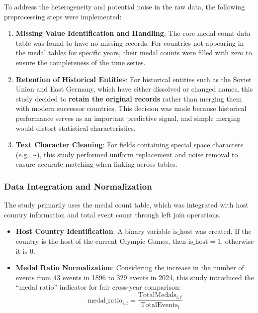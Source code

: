 \documentclass{mcmthesis}
\begin{document}
To address the heterogeneity and potential noise in the raw data, the following preprocessing steps were implemented:

\begin{enumerate}
    \item \textbf{Missing Value Identification and Handling}: The core medal count data table was found to have no missing records. For countries not appearing in the medal tables for specific years, their medal counts were filled with zero to ensure the completeness of the time series.
    \item \textbf{Retention of Historical Entities}: For historical entities such as the Soviet Union and East Germany, which have either dissolved or changed names, this study decided to \textbf{retain the original records} rather than merging them with modern successor countries. This decision was made because historical performance serves as an important predictive signal, and simple merging would distort statistical characteristics.
    \item \textbf{Text Character Cleaning}: For fields containing special space characters (e.g., \texttt{\textasciitilde}), this study performed uniform replacement and noise removal to ensure accurate matching when linking across tables.
\end{enumerate}

\subsubsection{Data Integration and Normalization}

The study primarily uses the medal count table, which was integrated with host country information and total event count through left join operations.

\begin{itemize}
    \item \textbf{Host Country Identification}: A binary variable $\text{is\_host}$ was created. If the country is the host of the current Olympic Games, then $\text{is\_host} = 1$, otherwise it is $0$.
    \item \textbf{Medal Ratio Normalization}: Considering the increase in the number of events from 43 events in 1896 to 329 events in 2024, this study introduced the ``medal ratio'' indicator for fair cross-year comparison:
    \[
    \text{medal\_ratio}_{i,t} = \frac{\text{TotalMedals}_{i,t}}{\text{TotalEvents}_t}
    \]
\end{itemize}
\end{document}
